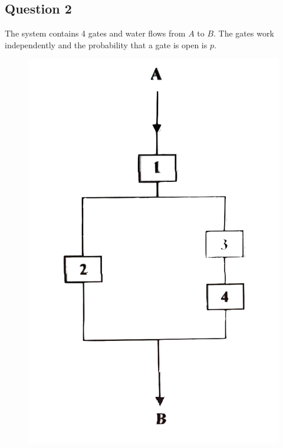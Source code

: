 \documentclass{article}
\begin{document}
\subsection*{Question 2}
The system contains 4 gates and water flows from $A$ to $B$. The gates work independently and the probability that a gate is open is $p$.
\begin{figure}[H]
    \centering
    \includegraphics[scale=0.15]{probability_gates.png}
\end{figure}
\end{document}
